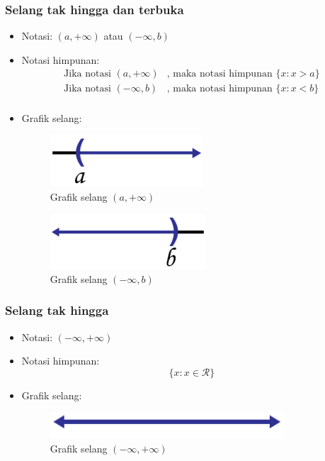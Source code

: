 \documentclass[pdflatex,compress,mathserif]{beamer}
\begin{document}
		\begin{frame}
			\frametitle{Selang tak hingga dan terbuka}
			\begin{itemize}
				\item Notasi: $ (a,+\infty) $ atau $ (-\infty,b) $
				\item Notasi himpunan:
				\begin{align*}
					\text{Jika notasi } (a,+\infty) & \text{, maka notasi himpunan }\{x:x > a\} \\
					\text{Jika notasi } (-\infty,b) & \text{, maka notasi himpunan }\{x: x < b\} \\
				\end{align*}
				\item Grafik selang:
				\begin{multicols}{2}
					\begin{figure}
						\centering
						\includegraphics[width=0.5\linewidth]{pict/08}
						\caption{Grafik selang $(a,+\infty)$}
						\label{fig:08}
					\end{figure}
					\columnbreak
					\begin{figure}
						\centering
						\includegraphics[width=0.5\linewidth]{pict/09}
						\caption{Grafik selang $(-\infty,b)$}
						\label{fig:09}
					\end{figure}
				\end{multicols}
			\end{itemize}
		\end{frame}
		
		\begin{frame}
			\frametitle{Selang tak hingga}
			\begin{itemize}
				\item Notasi: $ (-\infty,+\infty) $
				\item Notasi himpunan:
				\begin{equation*}
					\{ x : x \in \mathcal{R} \}
				\end{equation*}
				\item Grafik selang:
				\begin{figure}
					\centering
					\includegraphics[width=0.5\linewidth]{pict/10}
					\caption{Grafik selang $(-\infty,+\infty)$}
					\label{fig:10}
				\end{figure}
			\end{itemize}
		\end{frame}
	
\end{document}
